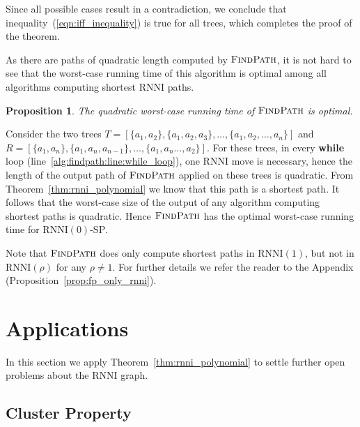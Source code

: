 \documentclass[11pt]{amsart}
\newtheorem{proposition}{Proposition}
\newcommand{\rnni}{\mathrm{RNNI}}
\newcommand{\findpath}{\textsc{FindPath}}
\newcommand{\decprob}[1]{\rnni(#1)\text{-}\mathrm{SP}}
\begin{document}
Since all possible cases result in a contradiction, we conclude that inequality~(\ref{eqn:iff_inequality}) is true for all trees, which completes the proof of the theorem.
\endproof

As there are paths of quadratic length computed by $\findpath$, it is not hard to see that the worst-case running time of this algorithm is optimal among all algorithms computing shortest $\rnni$ paths.

\begin{proposition}
	The quadratic worst-case running time of $\findpath$ is optimal.
\end{proposition}

\proof
	Consider the two trees $T = [\{a_1,a_2\},\{a_1,a_2,a_3\},\ldots,\{a_1,a_2,\ldots,a_n\}]$ and \linebreak $R = [\{a_1,a_n\}, \{a_1,a_n,a_{n-1}\},\ldots,\{a_1,a_n\ldots,a_2\}]$.
	For these trees, in every \textbf{while} loop (line~\ref{alg:findpath:line:while_loop}), one $\rnni$ move is necessary, hence the length of the output path of $\findpath$ applied on these trees is quadratic.
	From Theorem~\ref{thm:rnni_polynomial} we know that this path is a shortest path.
	It follows that the worst-case size of the output of any algorithm computing shortest paths is quadratic.
	Hence $\findpath$ has the optimal worst-case running time for $\decprob{0}$.
\endproof

Note that $\findpath$ does only compute shortest paths in $\rnni(1)$, but not in $\rnni(\rho)$ for any $\rho \neq 1$.
For further details we refer the reader to the Appendix (Proposition~\ref{prop:fp_only_rnni}).

\section{Applications}

In this section we apply Theorem~\ref{thm:rnni_polynomial} to settle further open problems about the $\rnni$ graph.

\subsection{Cluster Property}
\end{document}
